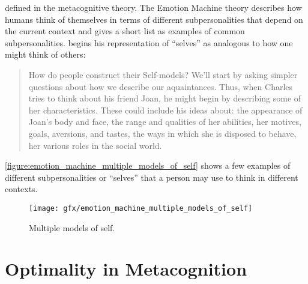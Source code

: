 defined in the metacognitive theory.  The Emotion Machine theory
describes how humans think of themselves in terms of different
subpersonalities that depend on the current context and gives a short
list as examples of common subpersonalities.
\cite{minsky:2006} begins his representation of ``selves'' as
analogous to how one might think of others:
\begin{quote}
How do people construct their Self-models?  We'll start by asking
simpler questions about how we describe our aquaintances.  Thus, when
Charles tries to think about his friend Joan, he might begin by
describing some of her characteristics.  These could include his ideas
about: the appearance of Joan's body and face, the range and qualities
of her abilities, her motives, goals, aversions, and tastes, the ways
in which she is disposed to behave, her various roles in the social
world.
\end{quote}
{\mbox{\autoref{figure:emotion_machine_multiple_models_of_self}}}
shows a few examples of different subpersonalities or ``selves'' that
a person may use to think in different contexts.
\begin{figure}
\centering
\texttt{[image: gfx/emotion\_machine\_multiple\_models\_of\_self]}
\caption{Multiple models of self.}
\label{figure:emotion_machine_multiple_models_of_self}
\end{figure}

\section{Optimality in Metacognition}

